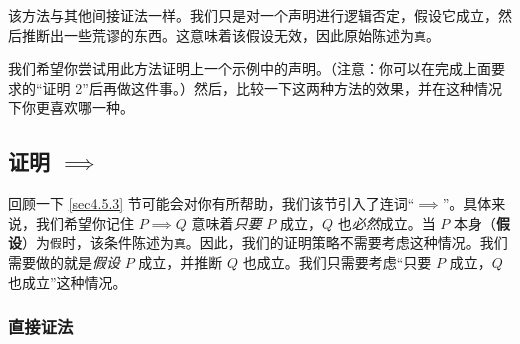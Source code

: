 该方法与其他间接证法一样。我们只是对一个声明进行逻辑否定，假设它成立，然后推断出一些荒谬的东西。这意味着该假设无效，因此原始陈述为\verb|真|。

我们希望你尝试用此方法证明上一个示例中的声明。（注意：你可以在完成上面要求的``证明 2''后再做这件事。）然后，比较一下这两种方法的效果，并在这种情况下你更喜欢哪一种。

\begin{center}
    \noindent {}
\end{center}

\subsection{证明 $\implies$}\label{sec:section4.9.5}

回顾一下 \ref{sec4.5.3} 节可能会对你有所帮助，我们该节引入了连词``$\implies$''。具体来说，我们希望你记住 $P \implies Q$ 意味着\emph{只要} $P$ 成立，$Q$ 也\emph{必然}成立。当 $P$ 本身（\textbf{假设}）为\verb|假|时，该条件陈述为\verb|真|。因此，我们的证明策略不需要考虑这种情况。我们需要做的就是\emph{假设} $P$ 成立，并推断 $Q$ 也成立。我们只需要考虑``只要 $P$ 成立，$Q$ 也成立''这种情况。

\subsubsection*{直接证法}

\begin{center}
    \noindent {}
\end{center}

